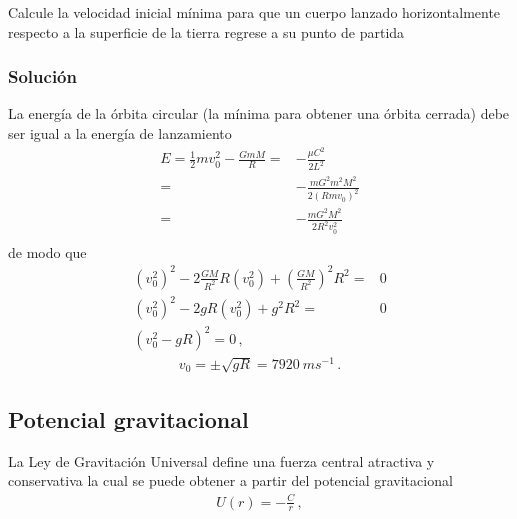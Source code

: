 \ejemplo{}
\begin{frame}
Calcule la velocidad inicial mínima para que un cuerpo lanzado horizontalmente respecto a la superficie de la tierra regrese a su punto de partida

\subsubsection{Solución}
La energía de la órbita circular (la mínima para obtener una órbita cerrada) debe ser igual a la energía de lanzamiento
\begin{align*}
  E=\frac{1}{2}m v_0^{2}-\frac{GmM}{R}=&-\frac{\mu C^2}{2 L^2}\nonumber\\
  =&-\frac{m G^2m^2M^2}{2 (Rmv_0)^2 }\nonumber\\
  =&-\frac{m G^2M^2}{2R^2v_0^2}\nonumber\\
\end{align*}
de modo que
\begin{align*}
  \left( v_0^2 \right)^2-2 \frac{GM}{R^2}R\left( v_0^2 \right)+\left( \frac{GM}{R^2} \right)^2R^2=&0 \nonumber\\
  \left( v_0^2 \right)^2-2 gR\left( v_0^2 \right)+g^2R^2=&0 \nonumber\\
\left(v_0^2-gR  \right)^2=0\,,
\end{align*}
\begin{align*}
  v_0=\pm \sqrt{gR}=\SI{7920}{m s^{-1}}\,.
\end{align*}
\end{frame}

\subsection{Potencial gravitacional}
\begin{frame}
La Ley de Gravitación Universal define una fuerza central atractiva y conservativa la cual se puede obtener a partir del potencial gravitacional
\begin{align*}
  U(r)=-\frac{C}{r}\,,
\end{align*}
\end{frame}

